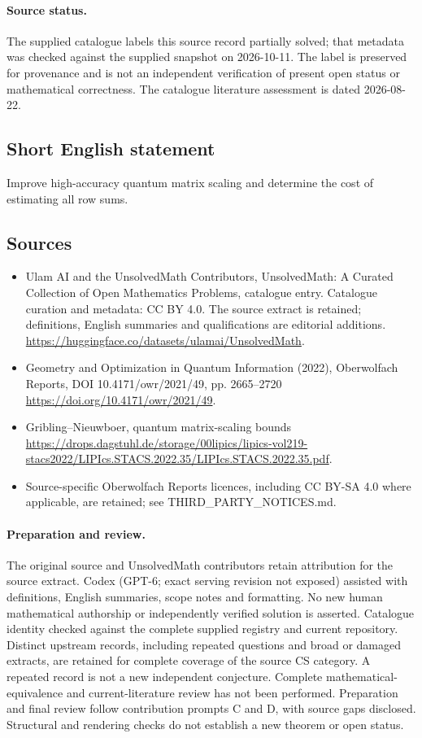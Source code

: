 \documentclass[11pt]{article}
\begin{document}
\paragraph{Source status.}
The supplied catalogue labels this source record partially solved; that metadata was checked against the supplied snapshot on 2026-10-11. The label is preserved for provenance and is not an independent verification of present open status or mathematical correctness. The catalogue literature assessment is dated 2026-08-22.
\subsection{Short English statement}
Improve high-accuracy quantum matrix scaling and determine the cost of estimating all row sums.
\subsection{Sources}
\begin{itemize}
\item[\hypertarget{source:statement:1}{S1}] Ulam AI and the UnsolvedMath Contributors, UnsolvedMath: A Curated Collection of Open Mathematics Problems, catalogue entry. Catalogue curation and metadata: CC BY 4.0. The source extract is retained; definitions, English summaries and qualifications are editorial additions.
\url{https://huggingface.co/datasets/ulamai/UnsolvedMath}.
\item[\hypertarget{source:statement:2}{S2}] Geometry and Optimization in Quantum Information (2022), Oberwolfach Reports, DOI 10.4171/owr/2021/49, pp. 2665--2720
\url{https://doi.org/10.4171/owr/2021/49}.
\item[\hypertarget{source:statement:3}{S3}] Gribling--Nieuwboer, quantum matrix-scaling bounds
\url{https://drops.dagstuhl.de/storage/00lipics/lipics-vol219-stacs2022/LIPIcs.STACS.2022.35/LIPIcs.STACS.2022.35.pdf}.
\item Source-specific Oberwolfach Reports licences, including CC BY-SA 4.0 where applicable, are retained; see THIRD\_PARTY\_NOTICES.md.
\end{itemize}
\paragraph{Preparation and review.}
The original source and UnsolvedMath contributors retain attribution for the source extract. Codex (GPT-6; exact serving revision not exposed) assisted with definitions, English summaries, scope notes and formatting. No new human mathematical authorship or independently verified solution is asserted. Catalogue identity checked against the complete supplied registry and current repository. Distinct upstream records, including repeated questions and broad or damaged extracts, are retained for complete coverage of the source CS category. A repeated record is not a new independent conjecture. Complete mathematical-equivalence and current-literature review has not been performed. Preparation and final review follow contribution prompts C and D, with source gaps disclosed. Structural and rendering checks do not establish a new theorem or open status.
\label{end:statement}
\end{document}
